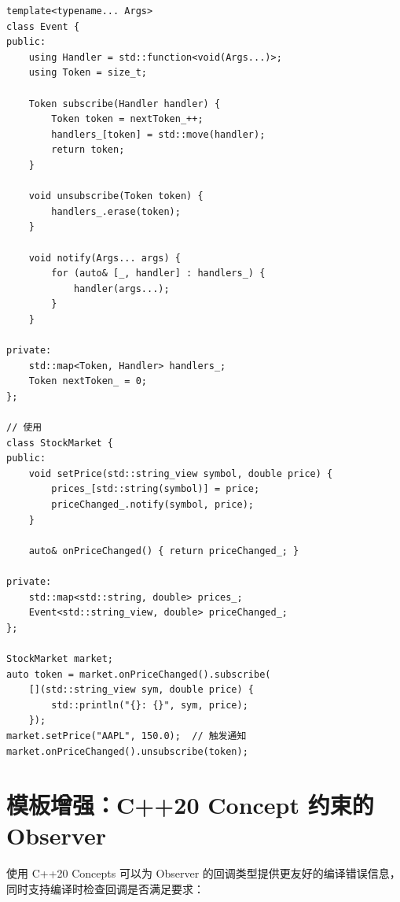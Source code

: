 \documentclass[12pt,a4paper,fontset=fandol]{ctexbook}
\begin{document}
\begin{lstlisting}[style=cppstyle, caption={观察者模式 --- C++ 实现}]
template<typename... Args>
class Event {
public:
    using Handler = std::function<void(Args...)>;
    using Token = size_t;

    Token subscribe(Handler handler) {
        Token token = nextToken_++;
        handlers_[token] = std::move(handler);
        return token;
    }

    void unsubscribe(Token token) {
        handlers_.erase(token);
    }

    void notify(Args... args) {
        for (auto& [_, handler] : handlers_) {
            handler(args...);
        }
    }

private:
    std::map<Token, Handler> handlers_;
    Token nextToken_ = 0;
};

// 使用
class StockMarket {
public:
    void setPrice(std::string_view symbol, double price) {
        prices_[std::string(symbol)] = price;
        priceChanged_.notify(symbol, price);
    }

    auto& onPriceChanged() { return priceChanged_; }

private:
    std::map<std::string, double> prices_;
    Event<std::string_view, double> priceChanged_;
};

StockMarket market;
auto token = market.onPriceChanged().subscribe(
    [](std::string_view sym, double price) {
        std::println("{}: {}", sym, price);
    });
market.setPrice("AAPL", 150.0);  // 触发通知
market.onPriceChanged().unsubscribe(token);
\end{lstlisting}

\section{模板增强：C++20 Concept 约束的 Observer}

使用 C++20 Concepts 可以为 Observer 的回调类型提供更友好的编译错误信息，同时支持编译时检查回调是否满足要求：
\end{document}
